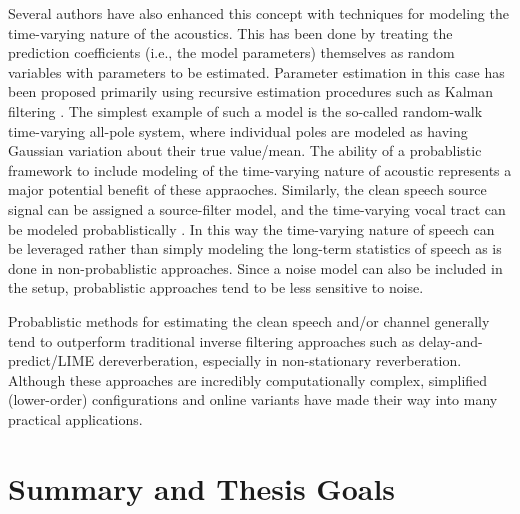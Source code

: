 Several authors have also enhanced this concept with techniques for modeling the time-varying nature of the acoustics. This has been done by treating the prediction coefficients (i.e., the model parameters) themselves as random variables with parameters to be estimated. Parameter estimation in this case has been proposed primarily using recursive estimation procedures such as Kalman filtering \citep[e.g., ][]{braun2016online, schmid2014variational}. The simplest example of such a model is the so-called random-walk time-varying all-pole system, where individual poles are modeled as having Gaussian variation about their true value/mean. The ability of a probablistic framework to include modeling of the time-varying nature of acoustic represents a major potential benefit of these appraoches. Similarly, the clean speech source signal can be assigned a source-filter model, and the time-varying vocal tract can be modeled probablistically \citep{grenier2003time}. In this way the time-varying nature of speech can be leveraged rather than simply modeling the long-term statistics of speech as is done in non-probablistic approaches. Since a noise model can also be included in the setup, probablistic approaches tend to be less sensitive to noise.
 
Probablistic methods for estimating the clean speech and/or channel generally tend to outperform traditional inverse filtering approaches such as delay-and-predict/LIME dereverberation, especially in non-stationary reverberation. Although these approaches are incredibly computationally complex, simplified (lower-order) configurations and online variants have made their way into many practical applications.

\section{Summary and Thesis Goals}

